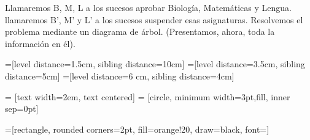 \vspace{-3mm} Llamaremos B, M, L a los sucesos aprobar Biología, Matemáticas y Lengua. llamaremos B', M' y L' a los sucesos suspender esas asignaturas.
Resolvemos el problema mediante un diagrama de árbol. (Presentamos, ahora, toda la información en él).

=[level distance=1.5cm, sibling distance=10cm]
=[level distance=3.5cm, sibling distance=5cm]
=[level distance=6 cm, sibling distance=4cm]

 = [text width=2em, text centered]
 = [circle, minimum width=3pt,fill, inner sep=0pt]

=[rectangle, rounded corners=2pt, fill=orange!20, draw=black, font=\small]

